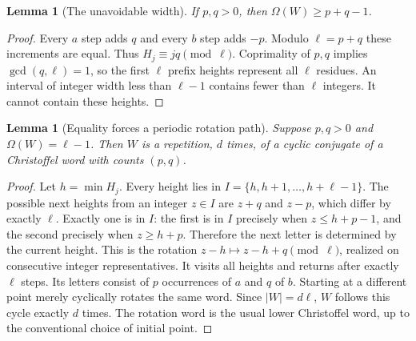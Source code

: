 \documentclass[11pt,letterpaper]{article}
\newtheorem{lemma}[theorem]{Lemma}
\theoremstyle{definition}
\begin{document}
\begin{lemma}[The unavoidable width]
\label{lem:lowerwidth}
If $p,q>0$, then $\Omega(W)\geq p+q-1$.
\end{lemma}
\begin{proof}
Every $a$ step adds $q$ and every $b$ step adds $-p$. Modulo $\ell=p+q$ these
increments are equal. Thus $H_j\equiv jq\pmod\ell$. Coprimality of $p,q$
implies $\gcd(q,\ell)=1$, so the first $\ell$ prefix heights represent all
$\ell$ residues. An interval of integer width less than $\ell-1$ contains
fewer than $\ell$ integers. It cannot contain these heights.
\end{proof}

\begin{lemma}[Equality forces a periodic rotation path]
\label{lem:rotation}
Suppose $p,q>0$ and $\Omega(W)=\ell-1$. Then $W$ is a repetition, $d$ times,
of a cyclic conjugate of a Christoffel word with counts $(p,q)$.
\end{lemma}
\begin{proof}
Let $h=\min H_j$. Every height lies in
$I=\{h,h+1,\ldots,h+\ell-1\}$. The possible next heights from an integer
$z\in I$ are $z+q$ and $z-p$, which differ by exactly $\ell$.
Exactly one is in $I$: the first is in $I$ precisely when
$z\leq h+p-1$, and the second precisely when $z\geq h+p$.
Therefore the next letter is determined by the current height. This is the
rotation $z-h\mapsto z-h+q\pmod\ell$, realized on consecutive integer
representatives. It visits all heights and returns after exactly $\ell$
steps. Its letters consist of $p$ occurrences of $a$ and $q$ of $b$.
Starting at a different point merely cyclically rotates the same word.
Since $|W|=d\ell$, $W$ follows this cycle exactly $d$ times. The rotation
word is the usual lower Christoffel word, up to the conventional choice of
initial point.
\end{proof}
\end{document}
